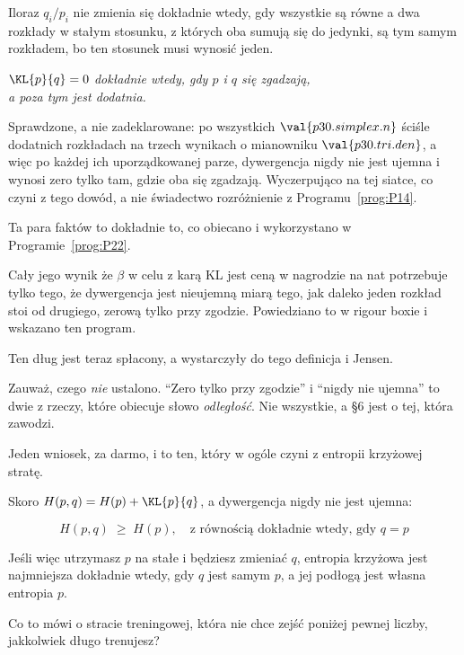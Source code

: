 \begin{fr}

Iloraz $q_i/p_i$ nie zmienia się dokładnie wtedy, gdy wszystkie są równe
\dash{} a dwa rozkłady w stałym stosunku, z których oba sumują się do
jedynki, są tym samym rozkładem, bo ten stosunek musi wynosić jeden.

\begin{center}
\emph{$\KL{p}{q} = 0$ dokładnie wtedy, gdy $p$ i $q$ się zgadzają,\\
a poza tym jest dodatnia.}
\end{center}

Sprawdzone, a nie zadeklarowane: po wszystkich $\val{p30.simplex.n}$
ściśle dodatnich rozkładach na trzech wynikach o mianowniku
$\val{p30.tri.den}$, a więc po każdej ich uporządkowanej parze,
dywergencja nigdy nie jest ujemna i wynosi zero tylko tam, gdzie oba się
zgadzają. Wyczerpująco na tej siatce, co czyni
z tego dowód, a nie świadectwo \dash{} rozróżnienie z
Programu~\ref{prog:P14}.

Ta para faktów to dokładnie to, co obiecano i wykorzystano w
Programie~\ref{prog:P22}.

Cały jego wynik \dash{} że $\beta$ w celu z karą KL jest ceną w nagrodzie na
nat \dash{} potrzebuje tylko tego, że dywergencja jest nieujemną miarą tego,
jak daleko jeden rozkład stoi od drugiego, zerową tylko przy zgodzie.
Powiedziano to w rigour boxie i wskazano ten program.

Ten dług jest teraz spłacony, a wystarczyły do tego definicja i Jensen.

\begin{note}
Zauważ, czego \emph{nie} ustalono. \enquote{Zero tylko przy zgodzie} i
\enquote{nigdy nie ujemna} to dwie z rzeczy, które obiecuje słowo
\emph{odległość}. Nie wszystkie, a §6 jest o tej, która zawodzi.
\end{note}
\end{fr}

\begin{fr}
Jeden wniosek, za darmo, i to ten, który w ogóle czyni z entropii krzyżowej
stratę.

Skoro $H(p, q) = H(p) + \KL{p}{q}$, a dywergencja nigdy nie jest ujemna:

\[ H(p, q) \;\ge\; H(p), \quad\text{z równością dokładnie wtedy, gdy } q = p \]

Jeśli więc utrzymasz $p$ na stałe i będziesz zmieniać $q$, entropia krzyżowa
jest najmniejsza dokładnie wtedy, gdy $q$ jest samym $p$, a jej podłogą jest
własna entropia $p$.

Co to mówi o stracie treningowej, która nie chce zejść poniżej pewnej
liczby, jakkolwiek długo trenujesz?
\dotline
\nextframe
\end{fr}

